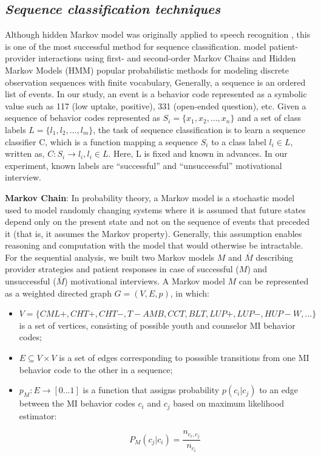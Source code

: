 \documentclass{amia}
\begin{document}
\subsection*{\textit{Sequence classification techniques}}

 Although hidden Markov model was originally applied to speech recognition \cite{rabiner1989tutorial}, this is one of the most successful method \cite{mutsam2016maximum, eickeler1998hidden, srivastava2007hmm, won2004training, chai2001folk} for sequence classification.
model patient-provider interactions using first- and second-order Markov Chains and Hidden Markov Models (HMM)
popular probabilistic methods for modeling discrete observation sequences with finite vocabulary,
Generally, a sequence is an ordered list of events. In our study, an event is a behavior code represented as a symbolic value such as 117 (low uptake, positive), 331 (open-ended question), etc.  Given a sequence of behavior codes represented as $S_i = \{x_1, x_2,...,x_n\}$ and a set of class labels $L = \{l_1, l_2,...,l_m\}$, the task of sequence classification is to learn a sequence classifier C, which is a function mapping a sequence $S_i$ to a class label $l_i \in L$, written as, $C : S_i \to l_i, l_i \in L$. Here, L is fixed and known in advances. In our experiment, known labels are ``successful'' and ``unsuccessful'' motivational interview. 

\textbf {Markov Chain}: In probability theory, a Markov model \cite{} is a stochastic model used to model randomly changing systems where it is assumed that future states depend only on the present state and not on the sequence of events that preceded it (that is, it assumes the Markov property). Generally, this assumption enables reasoning and computation with the model that would otherwise be intractable. For the sequential analysis, we built two Markov models $M$ and $\overline{M}$ describing provider strategies and patient responses in case of successful ($M$) and unsuccessful ($\overline{M}$) motivational interviews. A Markov model $M$ can be represented as a weighted directed graph $G = (V, E, p)$, in which:

\begin{itemize}
\item $V = \{CML+, CHT+, CHT-, T-AMB, CCT, BLT, LUP+, LUP-, HUP-W, ...\}$ is a set of vertices, consisting of possible youth and counselor MI behavior codes;
\item $E \subseteq V \times V$ is a set of edges corresponding to posssible transitions from one MI behavior code to the other in a sequence;
\item $p_M:E\rightarrow[0...1]$ is a function that assigns probability $p(c_i|c_j)$ to an edge between the MI behavior codes $c_i$ and $c_j$ based on maximum likelihood estimator:

\begin{equation}
P_M(c_j|c_i) = \frac{n_{c_i,c_j}}{n_{c_i}}
\end{equation}

\end{itemize}
\end{document}
